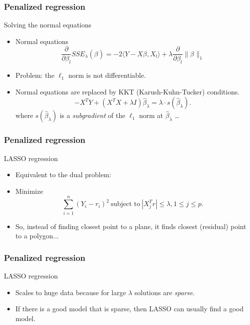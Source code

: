 \documentclass[handout]{beamer}
\newcommand{\B}[1]{\beta_{#1}}
\newcommand{\Bh}[1]{\widehat{\beta}_{#1}}
\begin{document}
   \begin{frame} \frametitle{Penalized regression}

   \begin{block}
       {Solving the normal equations}
       \begin{itemize}
   \item Normal equations
   $$
   \frac{\partial}{\partial \B{l}} SSE_{\lambda}(\B{}) = -2  \langle Y - X\B{}, X_l \rangle +  \lambda \frac{\partial}{\partial\B{l}} \|\B{}\|_1$$

       \item Problem: the $\ell_1$ norm is not differentiable.


   \item Normal equations are replaced by KKT (Karush-Kuhn-Tucker) conditions.
   $$
   -X^TY +  (X^TX + \lambda I) \Bh{\lambda} = \lambda \cdot s(\Bh{\lambda}).$$
   where $s(\Bh{\lambda})$ is a {\em subgradient} of the $\ell_1$ norm at
   $\Bh{\lambda}$ \dots
       \end{itemize}

   \end{block}
   \end{frame}


   \begin{frame} \frametitle{Penalized regression}

   \begin{block}
    {LASSO regression}
        \begin{itemize}
        \item Equivalent to the dual problem:

        \item Minimize
    $$
     \sum_{i=1}^n (Y_i - r_i)^2  \ \text{subject to} \ |X_j^Tr| \leq \lambda, 1 \leq j \leq p.$$

     \item So, instead of finding closest point to a plane, it finds closest
     (residual) point to a polygon...

        \end{itemize}

   \end{block}
   \end{frame}


   \begin{frame} \frametitle{Penalized regression}

   \begin{block}
    {LASSO regression}
        \begin{itemize}
        \item Scales to huge data because for
        large $\lambda$ solutions are {\em sparse}.

        \item If there is a good model that is sparse, then LASSO can usually
        find a good model.
        \end{itemize}

   \end{block}
   \end{frame}
\end{document}
